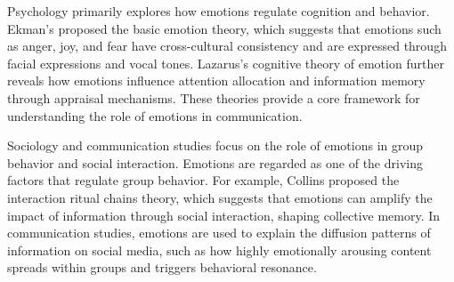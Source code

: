 Psychology primarily explores how emotions regulate cognition and behavior.  Ekman’s \cite{ekman1992argument} proposed the basic emotion theory, which suggests that emotions such as anger, joy, and fear have cross-cultural consistency and are expressed through facial expressions and vocal tones. Lazarus’s \cite{lazarus1991emotion} cognitive theory of emotion further reveals how emotions influence attention allocation and information memory through appraisal mechanisms. These theories provide a core framework for understanding the role of emotions in communication.


Sociology and communication studies focus on the role of emotions in group behavior and social interaction. Emotions are regarded as one of the driving factors that regulate group behavior. For example, Collins \cite{collins2004interaction} proposed the interaction ritual chains theory, which suggests that emotions can amplify the impact of information through social interaction, shaping collective memory. In communication studies, emotions are used to explain the diffusion patterns of information on social media, such as how highly emotionally arousing content spreads within groups and triggers behavioral resonance\cite{berger2011arousal}.

